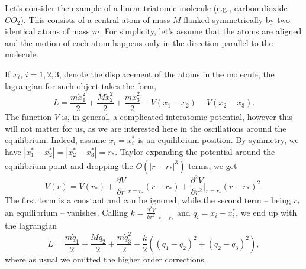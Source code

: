 \documentclass[english,fontsize=11pt,paper=a5,oneside]{scrbook}
\theoremstyle{definition}
\begin{document}
Let's consider the example of a linear triatomic molecule (e.g., carbon dioxide $CO_2$). 
This consists of a central atom of mass $M$ flanked symmetrically by two identical atoms of mass $m$.
For simplicity, let's assume that the atoms are aligned and the motion of each atom happens only in the direction parallel to the molecule.

If $x_i$, $i=1,2,3$, denote the displacement of the atoms in the molecule, the lagrangian for such object takes the form,
\begin{equation}
    L = \frac{m\dot x_1^2}2 + \frac{M\dot x_2^2}2 + \frac{m\dot x_3^2}2
        - V(x_1 - x_2) - V(x_2 - x_3).
\end{equation}
The function $V$ is, in general, a complicated interatomic potential, however this will not matter for us, as we are interested here in the oscillations around the equilibrium.
Indeed, assume $x_i = x_i^*$ is an equilibrium position. By symmetry, we have $|x_1^*-x_2^*| = |x_2^* - x_3^*| = r_*$.
Taylor expanding the potential around the equilibrium point and dropping the $O\left(|r-r_*|^3\right)$ terms, we get
\begin{equation}
    V(r) = V(r_*) + \frac{\partial V}{\partial r}\Big|_{r=r_*}(r-r_*) + \frac{\partial^2 V}{\partial r^2}\Big|_{r=r_*}(r-r_*)^2.
\end{equation}
The first term is a constant and can be ignored, while the second term -- being $r_*$ an equilibrium -- vanishes. Calling $k = \frac{\partial^2 V}{\partial r^2}\big|_{r=r_*}$ and $q_i = x_i - x_i^*$, we end up with the lagrangian
\begin{equation}
    L  = \frac{m \dot q_1}{2} + \frac{M \dot q_2}{2} + \frac{m\dot q_3^2}2 - \frac k2 \left((q_1 - q_2)^2 + (q_2 - q_3)^2\right),
\end{equation}
where as usual we omitted the higher order corrections.
\end{document}
